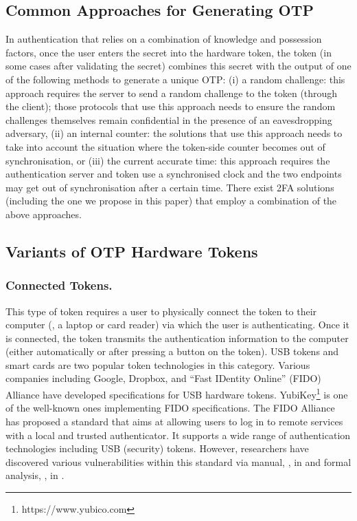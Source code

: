 \subsection{Common Approaches for Generating OTP}

In authentication that relies on a combination of knowledge and possession factors, once the user enters the secret into the hardware token, the token (in some cases after validating the secret) combines this secret with the output of one of the following methods to generate a unique OTP:  (i) a random challenge: this approach requires the server to send a random challenge to the token (through the client); those protocols that use this approach needs to ensure the random challenges themselves remain confidential in the presence of an eavesdropping adversary,  (ii) an internal counter:  the solutions that use this approach needs to take into account the situation where the token-side counter becomes out of synchronisation, or (iii) the current accurate time: this approach requires the authentication server and token use a synchronised clock and the two endpoints may get out of synchronisation after a certain time. There exist 2FA solutions (including the one we propose in this paper) that employ a combination of the above approaches. 
\subsection{Variants of OTP Hardware Tokens}

\subsubsection{Connected Tokens.}
This type of token requires a user to physically connect the token to their computer (\eg, a laptop or card reader) via which the user is authenticating. Once it is connected, the token transmits the authentication information to the computer (either automatically or after pressing a button on the token). USB tokens and smart cards are two popular token technologies in this category.  Various companies including Google, Dropbox, and  ``Fast IDentity Online'' (FIDO) Alliance have developed specifications for USB hardware tokens. YubiKey\footnote{https://www.yubico.com} is one of the well-known ones implementing FIDO specifications. The FIDO  Alliance has proposed a standard that aims at allowing users to log in to remote services with a local and trusted authenticator. It supports a wide range of authentication technologies including USB (security) tokens. However, researchers have discovered various vulnerabilities within this standard via manual, \eg, in \cite{PanosMNPX17,ChangMSS17,LoutfiJ15} and formal analysis, \eg, in \cite{ndss/FengLP021}. 


